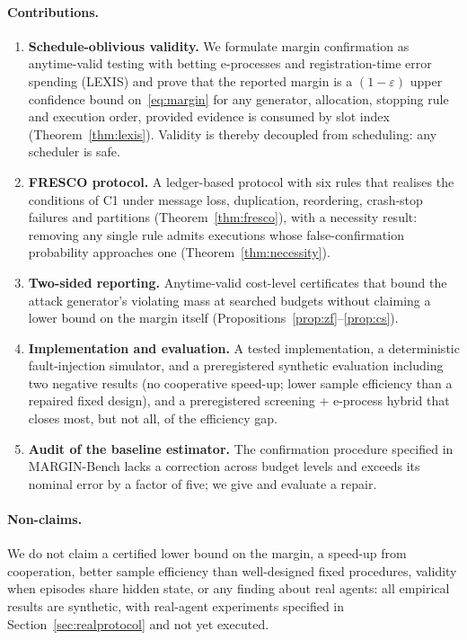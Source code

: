 \documentclass[11pt]{article}
\theoremstyle{definition}
\theoremstyle{remark}
\begin{document}
\paragraph{Contributions.}
\begin{enumerate}
\item[C1] \textbf{Schedule-oblivious validity.} We formulate margin confirmation as anytime-valid testing with betting e-processes and registration-time error spending (LEXIS) and prove that the reported margin is a $(1-\varepsilon)$ upper confidence bound on~\eqref{eq:margin} for any generator, allocation, stopping rule and execution order, provided evidence is consumed by slot index (Theorem~\ref{thm:lexis}). Validity is thereby decoupled from scheduling: any scheduler is safe.
\item[C2] \textbf{FRESCO protocol.} A ledger-based protocol with six rules that realises the conditions of C1 under message loss, duplication, reordering, crash-stop failures and partitions (Theorem~\ref{thm:fresco}), with a necessity result: removing any single rule admits executions whose false-confirmation probability approaches one (Theorem~\ref{thm:necessity}).
\item[C3] \textbf{Two-sided reporting.} Anytime-valid cost-level certificates that bound the attack generator's violating mass at searched budgets without claiming a lower bound on the margin itself (Propositions~\ref{prop:zf}--\ref{prop:cs}).
\item[C4] \textbf{Implementation and evaluation.} A tested implementation, a deterministic fault-injection simulator, and a preregistered synthetic evaluation including two negative results (no cooperative speed-up; lower sample efficiency than a repaired fixed design), and a preregistered screening + e-process hybrid that closes most, but not all, of the efficiency gap.
\item[C5] \textbf{Audit of the baseline estimator.} The confirmation procedure specified in MARGIN-Bench lacks a correction across budget levels and exceeds its nominal error by a factor of five; we give and evaluate a repair.
\end{enumerate}

\paragraph{Non-claims.} We do not claim a certified lower bound on the margin, a speed-up from cooperation, better sample efficiency than well-designed fixed procedures, validity when episodes share hidden state, or any finding about real agents: all empirical results are synthetic, with real-agent experiments specified in Section~\ref{sec:realprotocol} and not yet executed.
\end{document}
